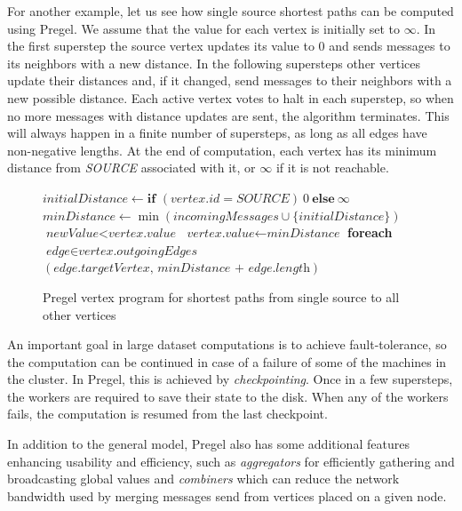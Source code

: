 For another example, let us see how single source shortest paths can be computed using Pregel. 
We assume that the value for each vertex is initially set to $\infty$.
In the first superstep the source vertex updates its value to $0$ and sends messages to its neighbors with a new distance. In the following supersteps
other vertices update their distances and, if it changed, send messages to their neighbors with a new possible distance. Each active vertex votes to halt in each superstep, so when no more messages with distance updates are sent, the algorithm terminates. This will always happen in a finite number of supersteps, as long as all edges have non-negative lengths. At the end of computation, each vertex has its minimum distance from \textit{SOURCE} associated with it, or $\infty$ if it is not reachable.

\begin{figure}[!htbp]
\begin{codebox}
  \li $\textit{initialDistance} \leftarrow \textbf{if }(vertex.id = \textit{SOURCE})~0~\textbf{else}~\infty$
  \li $\textit{minDistance} \leftarrow \min(\textit{incomingMessages} \cup \{\textit{initialDistance}\})$
  \li \If $\textit{newValue} < \textit{vertex.value}$
  \li \Then
	  $\textit{vertex.value} \leftarrow \textit{minDistance}$
  \li \textbf{foreach} $\textit{edge} \in \textit{vertex.outgoingEdges}$ \Then
  \li {}$(\textit{edge.targetVertex, minDistance + edge.length})$
  	  \End
      \End
  \li {}
\end{codebox}
\caption{Pregel vertex program for shortest paths from single source to all other vertices}
\end{figure}

An important goal in large dataset computations is to achieve fault-tolerance, so the computation can be continued in case of a failure of some of the machines in the cluster. In Pregel, this is achieved by \emph{checkpointing}. Once in a few supersteps, the workers are required to save their state to the disk. When any of the workers fails, the computation is resumed from the last checkpoint.

In addition to the general model, Pregel also has some additional features enhancing usability and efficiency, such as \emph{aggregators} for efficiently gathering and broadcasting global values and \emph{combiners} which can reduce the network bandwidth used by merging messages send from vertices placed on a given node.

